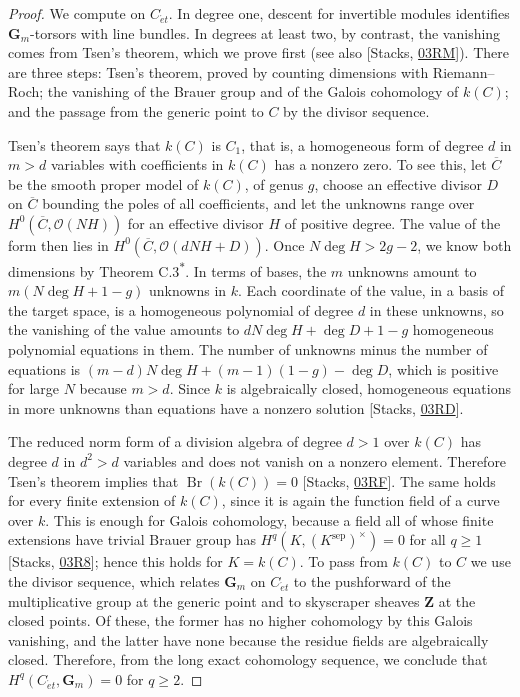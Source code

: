 \documentclass[11pt]{article}
\newcommand{\bpout}[1]{#1\textsuperscript{\hyperlink{bp-outside}{\ensuremath{\ast}}}}
\begin{document}
\begin{proof}[{Proof}]\label{bp8}%
We compute on \(C_{\acute{e}t}\). In degree one, descent for invertible modules identifies \(\mathbf G_m\)-torsors with line bundles. In degrees at least two, by contrast, the vanishing comes from Tsen's theorem, which we prove first (see also [Stacks, \href{https://stacks.math.columbia.edu/tag/03RM}{03RM}]). There are three steps: Tsen's theorem, proved by counting dimensions with Riemann–Roch; the vanishing of the Brauer group and of the Galois cohomology of \(k(C)\); and the passage from the generic point to \(C\) by the divisor sequence.

Tsen's theorem says that \(k(C)\) is \(C_1\), that is, a homogeneous form of degree \(d\) in \(m>d\) variables with coefficients in \(k(C)\) has a nonzero zero.  To see this, let \(\overline C\) be the smooth proper model of \(k(C)\), of genus \(g\), choose an effective divisor \(D\) on \(\overline C\) bounding the poles of all coefficients, and let the unknowns range over \(H^0(\overline C,\mathcal O(NH))\) for an effective divisor \(H\) of positive degree.  The value of the form then lies in \(H^0(\overline C,\mathcal O(dNH+D))\).  Once \(N\deg H>2g-2\), we know both dimensions by Theorem \bpout{C.3}.  In terms of bases, the \(m\) unknowns amount to \(m(N\deg H+1-g)\) unknowns in \(k\). Each coordinate of the value, in a basis of the target space, is a homogeneous polynomial of degree \(d\) in these unknowns, so the vanishing of the value amounts to \(dN\deg H+\deg D+1-g\) homogeneous polynomial equations in them.  The number of unknowns minus the number of equations is \((m-d)N\deg H+(m-1)(1-g)-\deg D\), which is positive for large \(N\) because \(m>d\).  Since \(k\) is algebraically closed, homogeneous equations in more unknowns than equations have a nonzero solution [Stacks, \href{https://stacks.math.columbia.edu/tag/03RD}{03RD}].

The reduced norm form of a division algebra of degree \(d>1\) over \(k(C)\) has degree \(d\) in \(d^2>d\) variables and does not vanish on a nonzero element.  Therefore Tsen's theorem implies that \(\operatorname{Br}(k(C))=0\) [Stacks, \href{https://stacks.math.columbia.edu/tag/03RF}{03RF}].  The same holds for every finite extension of \(k(C)\), since it is again the function field of a curve over \(k\). This is enough for Galois cohomology, because a field all of whose finite extensions have trivial Brauer group has \(H^q(K,(K^{\mathrm{sep}})^\times)=0\) for all \(q\geq1\) [Stacks, \href{https://stacks.math.columbia.edu/tag/03R8}{03R8}]; hence this holds for \(K=k(C)\). To pass from \(k(C)\) to \(C\) we use the divisor sequence, which relates \(\mathbf G_m\) on \(C_{\acute{e}t}\) to the pushforward of the multiplicative group at the generic point and to skyscraper sheaves \(\mathbf Z\) at the closed points. Of these, the former has no higher cohomology by this Galois vanishing, and the latter have none because the residue fields are algebraically closed. Therefore, from the long exact cohomology sequence, we conclude that \(H^q(C_{\acute{e}t},\mathbf G_m)=0\) for \(q\geq2\).


\end{proof}
\end{document}
